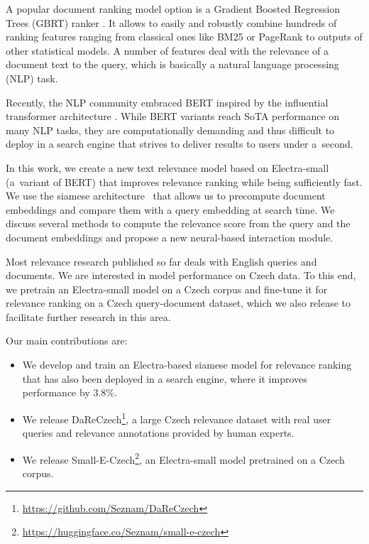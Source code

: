 \documentclass[letterpaper]{article} \usepackage{aaai22 }  \usepackage{times}  \usepackage{helvet}  \usepackage{courier}  \usepackage[hyphens]{url}  \usepackage{graphicx} \usepackage{amsmath,amsfonts,amssymb, mathabx,bm,bbm}
\begin{document}
A popular document ranking model option is a Gradient Boosted Regression Trees (GBRT) ranker \cite{zheng2007general}. It allows to easily and robustly combine hundreds of ranking features ranging from classical ones like BM25 \cite{robertson_BM25} or PageRank \cite{pagerank} to outputs of other statistical models. A number of features deal with the relevance of a document text to the query, which is basically a natural language processing (NLP) task.

Recently, the NLP community embraced BERT \cite{bert} inspired by the influential transformer architecture \cite{vaswani2017attention}. While BERT variants reach SoTA performance on many NLP tasks, they are computationally demanding and thus difficult to deploy in a search engine that strives to deliver results to users under a~second.

In this work, we create a new text relevance model based on Electra-small~\cite{electra} (a~variant of BERT) that improves relevance ranking while being sufficiently fast. We use the siamese architecture~\cite{sentence_bert} that allows us to precompute document embeddings and compare them with a query embedding at search time. We discuss several methods to compute the relevance score from the query and the document embeddings and propose a new neural-based interaction module. 

Most relevance research published so far deals with English queries and documents. We are interested in model performance on Czech data. To this end, we pretrain an Electra-small model on a Czech corpus and fine-tune it for relevance ranking on a Czech query-document dataset, which we also release to facilitate further research in this area.

Our main contributions are:
\begin{itemize}
    \item We develop and train an Electra-based siamese model for relevance ranking that has also been deployed in a search engine, where it improves performance by 3.8\%.

    \item We release DaReCzech\footnote{{\url{https://github.com/Seznam/DaReCzech}}}, a large Czech relevance dataset with real user queries and relevance annotations provided by human experts.
    
    \item We release Small-E-Czech\footnote{{\url{https://huggingface.co/Seznam/small-e-czech}}}, an Electra-small model pretrained on a Czech corpus. 
\end{itemize}
\end{document}
